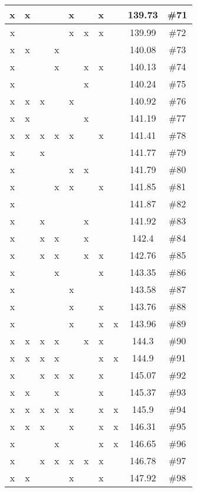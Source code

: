 \begin{center}
\begin{longtable}{|c|c|c|c|c|c|c|c|c|c|}
 x &  x &  &  &  x &  &  x &  & 139.73 & \#71 \\ \hline
 x &  &  &  &  x &  x &  x &  & 139.99 & \#72 \\ \hline
 x &  x &  &  x &  &  &  &  & 140.08 & \#73 \\ \hline
 x &  &  &  x &  &  x &  x &  & 140.13 & \#74 \\ \hline
 x &  &  &  &  &  x &  &  & 140.24 & \#75 \\ \hline
 x &  x &  x &  &  x &  &  &  & 140.92 & \#76 \\ \hline
 x &  x &  &  &  &  x &  &  & 141.19 & \#77 \\ \hline
 x &  x &  x &  x &  x &  &  x &  & 141.41 & \#78 \\ \hline
 x &  &  x &  &  &  &  &  & 141.77 & \#79 \\ \hline
 x &  &  &  &  x &  x &  &  & 141.79 & \#80 \\ \hline
 x &  &  &  x &  x &  &  x &  & 141.85 & \#81 \\ \hline
 x &  &  &  &  &  &  &  & 141.87 & \#82 \\ \hline
 x &  &  x &  &  &  x &  &  & 141.92 & \#83 \\ \hline
 x &  &  x &  x &  &  x &  &  & 142.4 & \#84 \\ \hline
 x &  &  x &  x &  &  x &  x &  & 142.76 & \#85 \\ \hline
 x &  &  &  x &  &  &  x &  & 143.35 & \#86 \\ \hline
 x &  &  &  &  x &  &  &  & 143.58 & \#87 \\ \hline
 x &  &  &  &  x &  &  x &  & 143.76 & \#88 \\ \hline
 x &  &  &  &  x &  &  x &  x & 143.96 & \#89 \\ \hline
 x &  x &  x &  x &  &  x &  x &  & 144.3 & \#90 \\ \hline
 x &  x &  x &  x &  &  &  x &  x & 144.9 & \#91 \\ \hline
 x &  &  x &  x &  x &  &  x &  & 145.07 & \#92 \\ \hline
 x &  x &  &  x &  &  &  x &  & 145.37 & \#93 \\ \hline
 x &  x &  x &  x &  x &  &  x &  x & 145.9 & \#94 \\ \hline
 x &  x &  x &  &  x &  &  x &  x & 146.31 & \#95 \\ \hline
 x &  &  &  x &  &  &  x &  x & 146.65 & \#96 \\ \hline
 x &  &  x &  x &  x &  x &  x &  & 146.78 & \#97 \\ \hline
 x &  x &  &  &  x &  &  x &  & 147.92 & \#98 \\ \hline

\end{longtable}
\end{center}
